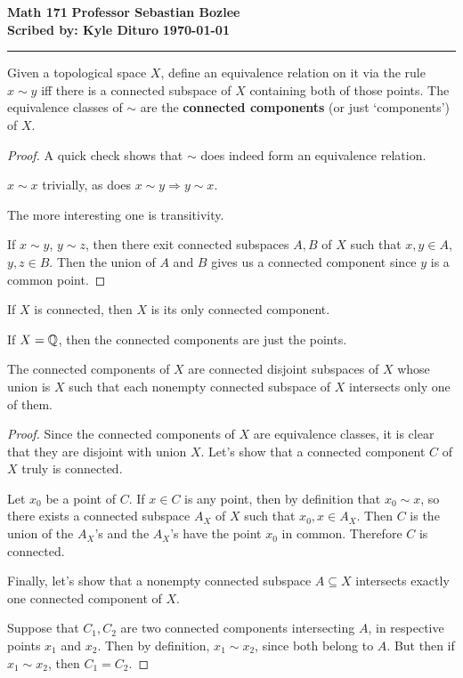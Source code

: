 \documentclass[12pt, twosided]{article}
\begin{document}
\noindent \textbf{Math 171} \hfill \textbf{Professor Sebastian Bozlee} \\
\textbf{Scribed by: Kyle Dituro} \hfill \textbf{\today}\hrule
\vspace{.2in}

\begin{df}
  Given a topological space \(X\), define an equivalence relation on it via the rule \(x \sim y\) iff there is a connected subspace of \(X\) containing both of those points. The equivalence classes of \(\sim\) are the \textbf{connected components} (or just `components') of \(X\).
\end{df}
\begin{proof}
  A quick check shows that \(\sim\) does indeed form an equivalence relation.

  \(x \sim x\) trivially, as does \(x \sim y \Rightarrow y \sim x\).

  The more interesting one is transitivity.

  If \(x \sim y\), \(y \sim z\), then there exit connected subspaces \(A, B \) of \(X\) such that \(x, y \in A\), \(y, z \in B\). Then the union of \(A\) and \(B\) gives us a connected component since \(y\) is a common point.
\end{proof}

\begin{exa}
  If \(X\) is connected, then \(X\) is its only connected component.

  If \(X = \mathbb{Q}\), then the connected components are just the points.
\end{exa}

\begin{lm}
  The connected components of \(X\) are connected disjoint subspaces of \(X\) whose union is \(X\) such that each nonempty connected subspace of \(X\) intersects only one of them.
\end{lm}

\begin{proof}
  Since the connected components of \(X\) are equivalence classes, it is clear that they are disjoint with union \(X\). Let's show that a connected component \(C\) of \(X\) truly is connected.

  Let \(x_0\) be a point of \(C\).  If \(x \in C\) is any point, then by definition that \(x_0 \sim x\), so there exists a connected subspace \(A_X\) of \(X\) such that \(x_0, x \in A_X\). Then \(C\) is the union of the \(A_X\)'s and the \(A_X\)'s have the point \(x_0\) in common. Therefore \(C\) is connected.

  Finally, let's show that a nonempty connected subspace \(A \subseteq X\) intersects exactly one connected component of \(X\).

  Suppose that \(C_1, C_2\) are two connected components intersecting \(A\), in respective points \(x_1\) and \(x_2\). Then by definition, \(x_1 \sim x_2\), since both belong to \(A\). But then if \(x_1 \sim x_2\), then \(C_1 = C_2\). 
\end{proof}
\end{document}
